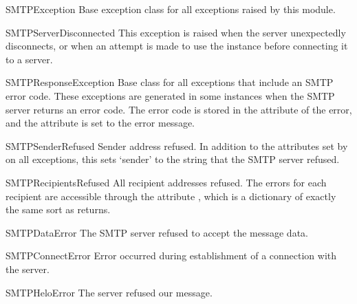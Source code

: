 \begin{excdesc}{SMTPException}
  Base exception class for all exceptions raised by this module.
\end{excdesc}

\begin{excdesc}{SMTPServerDisconnected}
  This exception is raised when the server unexpectedly disconnects,
  or when an attempt is made to use the  instance before
  connecting it to a server.
\end{excdesc}

\begin{excdesc}{SMTPResponseException}
  Base class for all exceptions that include an SMTP error code.
  These exceptions are generated in some instances when the SMTP
  server returns an error code.  The error code is stored in the
   attribute of the error, and the
   attribute is set to the error message.
\end{excdesc}

\begin{excdesc}{SMTPSenderRefused}
  Sender address refused.  In addition to the attributes set by on all
   exceptions, this sets `sender' to
  the string that the SMTP server refused.
\end{excdesc}

\begin{excdesc}{SMTPRecipientsRefused}
  All recipient addresses refused.  The errors for each recipient are
  accessible through the attribute , which is a
  dictionary of exactly the same sort as 
  returns.
\end{excdesc}

\begin{excdesc}{SMTPDataError}
  The SMTP server refused to accept the message data.
\end{excdesc}

\begin{excdesc}{SMTPConnectError}
  Error occurred during establishment of a connection  with the server.
\end{excdesc}

\begin{excdesc}{SMTPHeloError}
  The server refused our  message.
\end{excdesc}


\begin{seealso}
\end{seealso}



